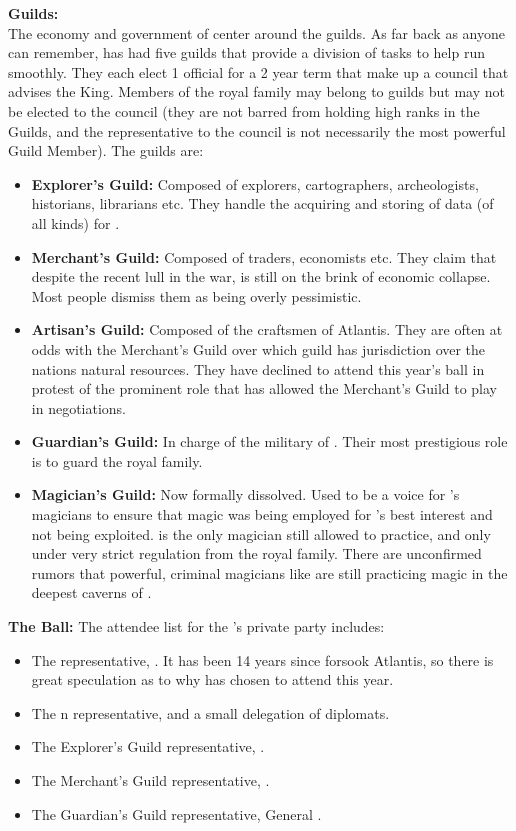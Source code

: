 \documentclass[blue]{NeptuneBall}
\begin{document}
{\bf Guilds:}\\
The economy and government of \pAtlantis{} center around the guilds. As far back as anyone can remember, \pAtlantis{} has had five guilds that provide a division of tasks to help \pAtlantis{} run smoothly. They each elect 1 official for a 2 year term that make up a council that advises the King.  Members of the royal family may belong to guilds but may not be elected to the council (they are not barred from holding high ranks in the Guilds, and the representative to the council is not necessarily the most powerful Guild Member). The guilds are:
\begin{itemize}
  \item {\bf Explorer's Guild:} Composed of explorers, cartographers, archeologists, historians, librarians etc. They handle the acquiring and storing of data (of all kinds) for \pAtlantis{}.
  \item{\bf Merchant's Guild:} Composed of traders, economists etc. They claim that despite the recent lull in the war, \pAtlantis{} is  still on the brink of economic collapse. Most people dismiss them as being overly pessimistic.
  \item {\bf Artisan's Guild:} Composed of the craftsmen of Atlantis. They are often at odds with the Merchant's Guild over which guild has jurisdiction over the nations natural resources. They have declined to attend this year's ball in protest of the prominent role that \cKing{\King} \cKing{} has allowed the Merchant's Guild to play in negotiations.
  \item {\bf Guardian's Guild:} In charge of the military of \pAtlantis{}. Their most prestigious role is to guard the royal family.
  \item {\bf Magician's Guild:}  Now formally dissolved. Used to be a voice for \pAtlantis{}'s magicians to ensure that magic was being employed for \pAtlantis{}'s best interest and not being exploited. \cManta{} is the only magician still allowed to practice, and only under very strict regulation from the royal family. There are unconfirmed rumors that powerful, criminal magicians like \cWitch{} are still practicing magic in the deepest caverns of \pAtlantis{}.\\
\end{itemize}

{\bf The \cExExKing{} Ball:}
The attendee list for the \cKing{\King}'s private party includes:
\begin{itemize}
  \item The \pAmerica{} representative, \cAriel{\King} \cAriel{}. It has been 14 years since \cAriel{\MYname{}} forsook Atlantis, so there is great speculation as to why \cAriel{\they} has chosen to attend this year.
  \item The \pPacifica{}n representative, \cPrince{\Prince} \cPrince{} and a small delegation of diplomats.
  \item The Explorer's Guild representative, \cPriest{}.
  \item The Merchant's Guild representative, \cSlave{}.
  \item The Guardian's Guild representative, General \cGeneral{}.
\end{itemize}
\end{document}
